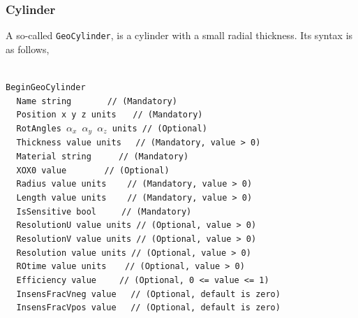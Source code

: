 \subsubsection{Cylinder}
\label{subsubsec:Cylinder}

A so-called {\tt GeoCylinder}, is a cylinder with a small radial thickness. Its syntax is as follows,

~\\
\noindent
{\tt BeginGeoCylinder} \\
$~~~~~${\tt Name             string                   $~~~~~~~~~~~~$   // (Mandatory)} \\
$~~~~~${\tt Position         x  y  z units                     $~~~$   // (Mandatory)} \\
$~~~~~${\tt RotAngles        $\alpha_x$  $\alpha_y$  $\alpha_z$ units  // (Optional)}  \\
$~~~~~${\tt Thickness        value  units                       $~~$   // (Mandatory, value > 0)} \\
$~~~~~${\tt Material         string                       $~~~~~~~~$   // (Mandatory)} \\
$~~~~~${\tt XOX0             value                   $~~~~~~~~~~~~~$   // (Optional)}  \\
$~~~~~${\tt Radius           value units                     $~~~~~$   // (Mandatory, value > 0)} \\
$~~~~~${\tt Length           value units                     $~~~~~$   // (Mandatory, value > 0)} \\
$~~~~~${\tt IsSensitive      bool                          $~~~~~~~$   // (Mandatory)} \\
$~~~~~${\tt ResolutionU      value units                               // (Optional, value > 0)} \\
$~~~~~${\tt ResolutionV      value units                               // (Optional, value > 0)} \\
$~~~~~${\tt Resolution       value units                               // (Optional, value > 0)} \\
$~~~~~${\tt ROtime           value units                      $~~~~$   // (Optional, value > 0)} \\
$~~~~~${\tt Efficiency       value                          $~~~~~~$   // (Optional, 0 <= value <= 1)} \\
$~~~~~${\tt InsensFracVneg   value                              $~~$   // (Optional, default is zero)} \\
$~~~~~${\tt InsensFracVpos   value                              $~~$   // (Optional, default is zero)} \\
